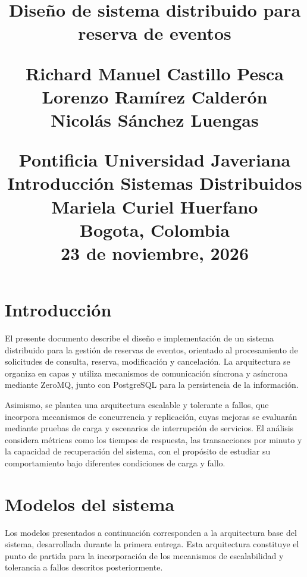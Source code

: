 \documentclass[conference]{IEEEtran}
\begin{document}
\title{Diseño de sistema distribuido para reserva de eventos \\
    \vspace{1cm}

    \large 
    Richard Manuel Castillo Pesca \\
    Lorenzo Ramírez Calderón \\
    Nicolás Sánchez Luengas

    \vspace{1cm}
    Pontificia Universidad Javeriana \\ 
    Introducción Sistemas Distribuidos \\
    Mariela Curiel Huerfano \\ 
    Bogota, Colombia \\
    23 de noviembre, 2026
}

\author{}

\maketitle

\section{Introducción}
El presente documento describe el diseño e implementación de un sistema distribuido para la gestión de reservas de eventos, 
orientado al procesamiento de solicitudes de consulta, reserva, modificación y cancelación. 
La arquitectura se organiza en capas y utiliza mecanismos de comunicación síncrona y asíncrona mediante ZeroMQ, 
junto con PostgreSQL para la persistencia de la información.

Asimismo, se plantea una arquitectura escalable y tolerante a fallos, que incorpora mecanismos de concurrencia 
y replicación, cuyas mejoras se evaluarán mediante pruebas de carga y escenarios de interrupción de servicios. 
El análisis considera métricas como los tiempos de respuesta, las transacciones por minuto y la capacidad de 
recuperación del sistema, con el propósito de estudiar su comportamiento bajo diferentes condiciones de carga y fallo.


\section{Modelos del sistema}

Los modelos presentados a continuación corresponden a la arquitectura base del sistema, 
desarrollada durante la primera entrega. Esta arquitectura constituye el punto de partida para la incorporación 
de los mecanismos de escalabilidad y tolerancia a fallos descritos posteriormente.
\end{document}
